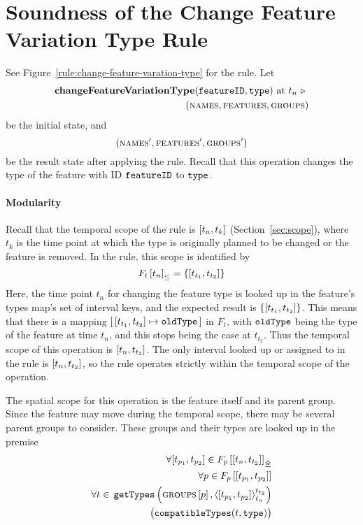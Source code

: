 
\section{Soundness of the Change Feature Variation Type Rule} 
\label{sec:soundness-of-the-change-feature-variation-type-rule}

See Figure~\vref{rule:change-feature-varation-type} for the  rule. Let 
\begin{equation*}
   \begin{split}
      \textbf{changeFeatureVariationType}(\texttt{featureID}, \texttt{type}) \text{ at } t_n \ \triangleright \  \\
      (\textsc{names}, \textsc{features}, \textsc{groups}{})
   \end{split}
\end{equation*}
be the initial state, and
\[
   (\textsc{names}', \textsc{features}', \textsc{groups}{}')
\]
be the result state after applying the  rule. Recall that this operation changes the type of the feature with ID $\texttt{featureID}$ to $\texttt{type}$.

\paragraph{Modularity}
Recall that the temporal scope of the  rule is $\interval{t_n}{t_k}$ (Section~\vref{sec:scope}), where $t_k$ is the time point at which the type is originally planned to be changed or the feature is removed. In the rule, this scope is identified by 
   \[
      \containing{F_t}{t_n} = \set{\interval{t_{t_1}}{t_{t_2}}}
   \]
   Here, the time point $t_n$ for changing the feature type is looked up in the feature's types map's set of interval keys, and the expected result is $\set{\interval{t_{t_1}}{t_{t_2}}}$. This means that there is a mapping $\intervalmapping{t_{t_1}}{t_{t_2}}{\var{oldType}}$ in $F_t$, with $\texttt{oldType}$ being the type of the feature at time $t_n$, and this stops being the case at $t_{t_2}$. Thus the temporal scope of this operation is $\interval{t_n}{t_{t_2}}$. The only interval looked up or assigned to in the rule is $\interval{t_n}{t_{t_2}}$, so the rule operates strictly within the temporal scope of the operation.

   The spatial scope for this operation is the feature itself and its parent group. Since the feature may move during the temporal scope, there may be several parent groups to consider. These groups and their types are looked up in the premise
\[
   \begin{split}
      \forall \interval{t_{p_1}}{t_{p_2}} \in \overlapping{F_p}{t_n}{t_{t_2}}  \\ %
      \forall p \in \lookup{F_p}{\interval{t_{p_1}}{t_{p_2}}}  \\%
      \forall t \in \, \var{getTypes}\left(\lookup{\groups}{p}, \clamp{\interval{t_{p_1}}{t_{p_2}}}{t_n}{t_{t_2}}\right)  \\
          \big(\var{compatibleTypes}(t, \var{type})\big) 
    \end{split}
\]

